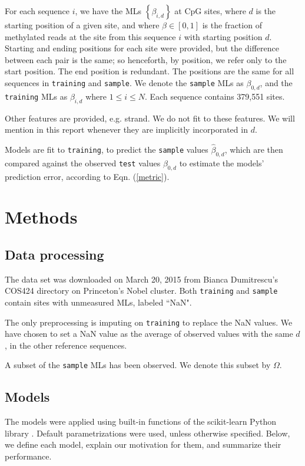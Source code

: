 \documentclass{article} %
\begin{document}
For each sequence $i$, we have the MLs $\left\{\beta_{i,d}\right\}$ at CpG sites, where $d$ is the starting position of a given site, and where $\beta \in [0,1]$ is the fraction of methylated reads at the site from this sequence $i$ with starting position $d$. Starting and ending positions for each site were provided, but the difference between each pair is the same; so henceforth, by position, we refer only to the start position. The end position is redundant. The positions are the same for all sequences in \texttt{training} and \texttt{sample}. We denote the \texttt{sample} MLs as $\beta_{0,d}$, and the \texttt{training} MLs as $\beta_{i,d}$ where $1 \leq i \leq N$. Each sequence contains 379,551 sites.

Other features are provided, e.g. strand. We do not fit to these features. We will mention in this report whenever they are implicitly incorporated in $d$.

Models are fit to \texttt{training}, to predict the \texttt{sample} values $\hat{\beta}_{0,d}$, which are then compared against the observed \texttt{test} values $\beta_{0,d}$ to estimate the models' prediction error, according to Eqn. (\ref{metric}).



\section{Methods}

\subsection{Data processing}

The data set was downloaded on March 20, 2015 from Bianca Dumitrescu's COS424 directory on Princeton's Nobel cluster. Both \texttt{training} and \texttt{sample} contain sites with unmeasured MLs, labeled ``NaN".

The only preprocessing is imputing on \texttt{training} to replace the NaN values. We have chosen to set a NaN value as the average of observed values with the same $d$, in the other reference sequences. 

A subset of the \texttt{sample} MLs has been observed. We denote this subset by $\Omega$.

\subsection{Models}

The models were applied using built-in functions of the scikit-learn Python library \cite{scikit-learn}. Default parametrizations were used, unless otherwise specified. Below, we define each model, explain our motivation for them, and summarize their performance.
\end{document}
